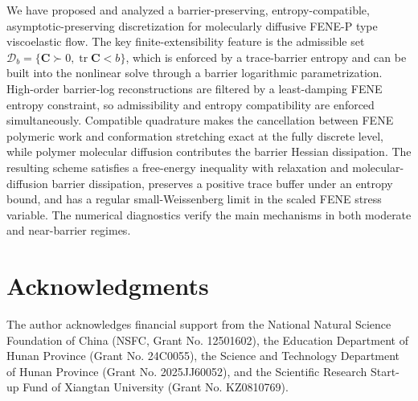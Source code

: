 ﻿\documentclass[11pt]{amsart}
\newcommand{\CC}{\bm C}
\newcommand{\calD}{\mathcal D}
\newcommand{\tr}{\operatorname{tr}}
\begin{document}
We have proposed and analyzed a barrier-preserving, entropy-compatible, asymptotic-preserving discretization for molecularly diffusive FENE-P type viscoelastic flow.  The key finite-extensibility feature is the admissible set $\calD_b=\{\CC\succ0,\tr\CC<b\}$, which is enforced by a trace-barrier entropy and can be built into the nonlinear solve through a barrier logarithmic parametrization.  High-order barrier-log reconstructions are filtered by a least-damping FENE entropy constraint, so admissibility and entropy compatibility are enforced simultaneously.  Compatible quadrature makes the cancellation between FENE polymeric work and conformation stretching exact at the fully discrete level, while polymer molecular diffusion contributes the barrier Hessian dissipation.  The resulting scheme satisfies a free-energy inequality with relaxation and molecular-diffusion barrier dissipation, preserves a positive trace buffer under an entropy bound, and has a regular small-Weissenberg limit in the scaled FENE stress variable.  The numerical diagnostics verify the main mechanisms in both moderate and near-barrier regimes.

\section*{Acknowledgments}

The author acknowledges financial support from the National Natural Science Foundation of China (NSFC, Grant No. 12501602), the Education Department of Hunan Province (Grant No. 24C0055), the Science and Technology Department of Hunan Province (Grant No. 2025JJ60052), and the Scientific Research Start-up Fund of Xiangtan University (Grant No. KZ0810769).
\end{document}
